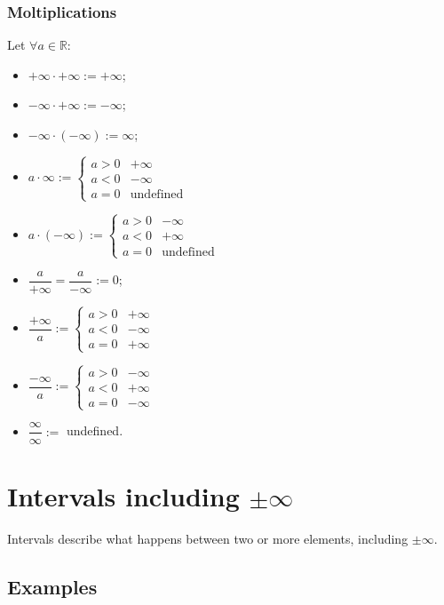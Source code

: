 \documentclass{article}
\begin{document}
\subsubsection{Moltiplications}
Let $\forall a \in \mathbb{R}$:
\begin{itemize}
    \item $+\infty \cdot +\infty := +\infty$;
    \item $-\infty \cdot +\infty := -\infty$;
    \item $-\infty \cdot (-\infty) := \infty$;
    \item $a \cdot \infty := \begin{cases}
        a > 0 &+\infty\\
        a < 0 &-\infty\\
        a = 0 & \text{undefined}
    \end{cases}$
    \item $a \cdot (-\infty):= \begin{cases}
        a > 0 &-\infty\\
        a < 0 &+\infty\\
        a = 0 &\text{undefined}
    \end{cases}$
    \item $\dfrac{a}{+\infty}=\dfrac{a}{-\infty} := 0$;
    \item $\dfrac{+\infty}{a}:= \begin{cases}
        a > 0 &+\infty\\
        a < 0 &-\infty\\
        a = 0 &+\infty
    \end{cases}$
    \item $\dfrac{-\infty}{a}:= \begin{cases}
        a > 0 &-\infty\\
        a < 0 &+\infty\\
        a = 0 &-\infty
    \end{cases}$
    \item $\dfrac{\infty}{\infty}:=$ undefined.
\end{itemize}

\section{Intervals including $\pm \infty$}
Intervals describe what happens between two or more elements, including $\pm \infty$.
\subsection{Examples}
\end{document}
